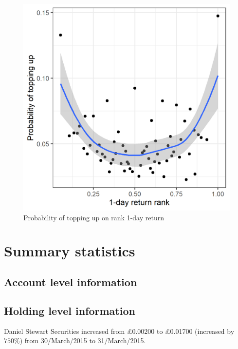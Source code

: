 \documentclass[12pt]{article}
\begin{document}
\begin{figure}[h]
	\includegraphics[scale=0.7]{figure_probtopup_1dayreturnrank}
	\centering
	\caption{Probability of topping up on rank 1-day return}
\end{figure}


\newpage

\section{Summary statistics}

 \subsection{Account level information}
 

 
 \subsection{Holding level information}



Daniel Stewart Securities increased from \pounds0.00200 to \pounds0.01700 (increased by $750\%$) from 30/March/2015 to 31/March/2015.

\newpage
\end{document}
